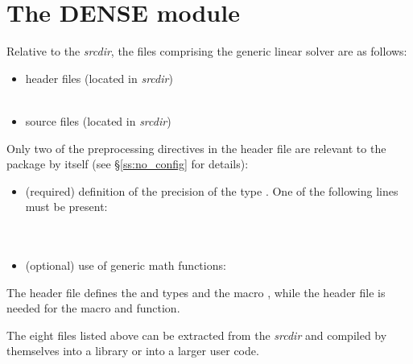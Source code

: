 
\section{The DENSE module}\label{ss:dense}

Relative to the {\sundials} {\em srcdir}, the files comprising the
{\dense} generic linear solver are as follows:
\begin{itemize}
\item header files (located in {\em srcdir})\\
    \\
     
\item source files (located in {\em srcdir})\\
    
\end{itemize}
Only two of the preprocessing directives in the header file  
are relevant to the {\dense} package by itself (see \S\ref{ss:no_config} for details):
\begin{itemize}
\item (required) definition of the precision of the {\sundials} type . 
  One of the following lines must be present:\\
  \\
  \\
\item (optional) use of generic math functions:
\end{itemize}
The  header file defines the {\sundials}
 and  types and the macro , while the 
 header file is needed for the  macro and  function.

The eight files listed above can be extracted from the {\sundials} {\em srcdir} and
compiled by themselves into a {\dense} library or into a larger user code.

